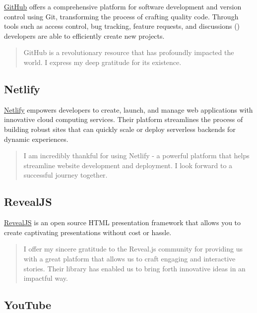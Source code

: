\documentclass[
  twoside,
  12pt,
  letterpaper,
  fleqn]{article}
\begin{document}
\href{https://github.com/about}{GitHub} offers a comprehensive platform
for software development and version control using Git, transforming the
process of crafting quality code. Through tools such as access control,
bug tracking, feature requests, and discussions
(\textcite{hata2022github}) developers are able to efficiently create
new projects.

\begin{quote}
GitHub is a revolutionary resource that has profoundly impacted the
world. I express my deep gratitude for its existence.
\end{quote}

\hypertarget{netlify}{%
\subsection{Netlify}\label{netlify}}

\href{https://www.netlify.com}{Netlify} empowers developers to create,
launch, and manage web applications with innovative cloud computing
services. Their platform streamlines the process of building robust
sites that can quickly scale or deploy serverless backends for dynamic
experiences.

\begin{quote}
I am incredibly thankful for using Netlify - a powerful platform that
helps streamline website development and deployment. I look forward to a
successful journey together.
\end{quote}

\hypertarget{revealjs}{%
\subsection{RevealJS}\label{revealjs}}

\href{https://revealjs.com}{RevealJS} is an open source HTML
presentation framework that allows you to create captivating
presentations without cost or hassle.

\begin{quote}
I offer my sincere gratitude to the Reveal.js community for providing us
with a great platform that allows us to craft engaging and interactive
stories. Their library has enabled us to bring forth innovative ideas in
an impactful way.
\end{quote}

\hypertarget{youtube}{%
\subsection{YouTube}\label{youtube}}
\end{document}
